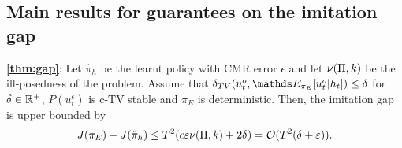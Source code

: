 \subsection{Main results for guarantees on the imitation gap}\label{appendix:gap}

\textbf{\cref{thm:gap}}: Let $\hat{\pi}_h$ be the learnt policy with CMR error $\epsilon$ and let $\nu(\Pi,k)$ be the ill-posedness of the problem. Assume that $\delta_{TV}(u^o_t,\expectE_{\pi_E}[u^o_t\lvert h_t])\leq\delta$ for $\delta\in\mathbb{R}^+$, $P(u^\epsilon_t)$ is c-TV stable and $\pi_E$ is deterministic. Then, the imitation gap is upper bounded by
\begin{align*}
    J(\pi_E)-J(\hat{\pi}_h)\leq T^2(c\varepsilon\nu(\Pi,k)+2\delta)=\mathcal{O}(T^2(\delta+\varepsilon)).
\end{align*}

